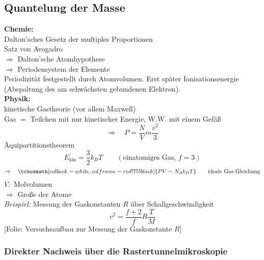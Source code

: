 \documentclass[titlepage,11pt,a4paper,ngerman]{report}
\newcommand{\tx}[1]{\textrm{#1}}
\newcommand{\ol}[1]{\overline{#1}}
\newcommand{\folie}[1]{\color{gray}[Folie: #1]\color{black}}
\newcommand{\rmbox}[1]{\tcboxmath[colback=white,colframe=red!75!black]{#1}}
\begin{document}
\subsection{Quantelung der Masse}

\textbf{Chemie:}\\
Dalton'sches Gesetz der multiples Proportionen\\
Satz von Avogadro\\[5pt]
$ \Rightarrow $ Dalton'sche Atomhypothese\\
$ \Rightarrow $ Periodensystem der Elemente\\[5pt]
Periodizität festgestellt durch Atomvolumen. Erst später Ionisationsenergie (Abspaltung des am schwächsten gebundenen Elektron).\\[5pt]
\textbf{Physik:}\\
kinetische Gastheorie (vor allem Maxwell)\\
Gas $ = $ Teilchen mit nur kinetischer Energie, W.W. mit einem Gefäß
\begin{equation*}
\Rightarrow \quad P = \frac{N}{V} m \frac{\ol{v}^2}{3}
\end{equation*}
Äquipartitionstheorem
\begin{equation*}
\ol{E_{\tx{kin}}} = \frac{3}{2} k_B T \qquad (\tx{einatomiges Gas, } f = 3)
\end{equation*}
\begin{equation*}
\Rightarrow \quad \rmbox{P V = N_A k_B T} \qquad \tx{ideale Gas Gleichung}
\end{equation*}
$ V : $ Molvolumen\\
$ \Rightarrow $ Große der Atome\\[5pt]
\emph{Beispiel:} Messung der Gaskonstanten $ R $ über Schallgeschwindigkeit\\
\begin{equation*}
c^2 = \frac{f + 2}{f} R \frac{T}{M} 
\end{equation*}
\folie{Versuchsaufbau zur Messung der Gaskonstante $ R $}

\subsubsection{Direkter Nachweis über die Rastertunnelmikroskopie}
\end{document}
